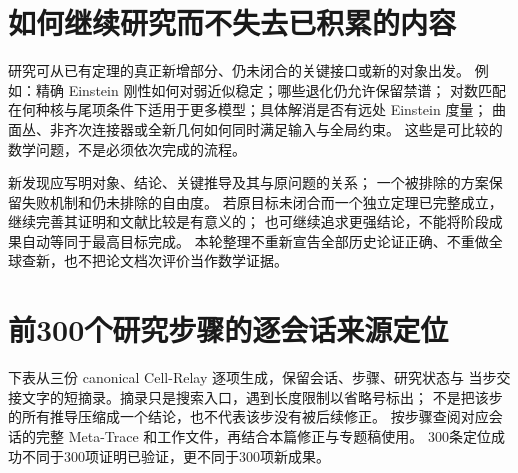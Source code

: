 \documentclass[UTF8,fontset=fandol,zihao=-4]{ctexart}
\begin{document}
\section{如何继续研究而不失去已积累的内容}
研究可从已有定理的真正新增部分、仍未闭合的关键接口或新的对象出发。
例如：精确 Einstein 刚性如何对弱近似稳定；哪些退化仍允许保留禁谱；
对数匹配在何种核与尾项条件下适用于更多模型；具体解消是否有远处 Einstein 度量；
曲面丛、非齐次连接器或全新几何如何同时满足输入与全局约束。
这些是可比较的数学问题，不是必须依次完成的流程。

新发现应写明对象、结论、关键推导及其与原问题的关系；
一个被排除的方案保留失败机制和仍未排除的自由度。
若原目标未闭合而一个独立定理已完整成立，继续完善其证明和文献比较是有意义的；
也可继续追求更强结论，不能将阶段成果自动等同于最高目标完成。
本轮整理不重新宣告全部历史论证正确、不重做全球查新，也不把论文档次评价当作数学证据。

\appendix
\section{前300个研究步骤的逐会话来源定位}\label{sec:steps}
下表从三份 canonical Cell-Relay 逐项生成，保留会话、步骤、研究状态与
当步交接文字的短摘录。摘录只是搜索入口，遇到长度限制以省略号标出；
不是把该步的所有推导压缩成一个结论，也不代表该步没有被后续修正。
按步骤查阅对应会话的完整 Meta-Trace 和工作文件，再结合本篇修正与专题稿使用。
300条定位成功不同于300项证明已验证，更不同于300项新成果。
\end{document}
